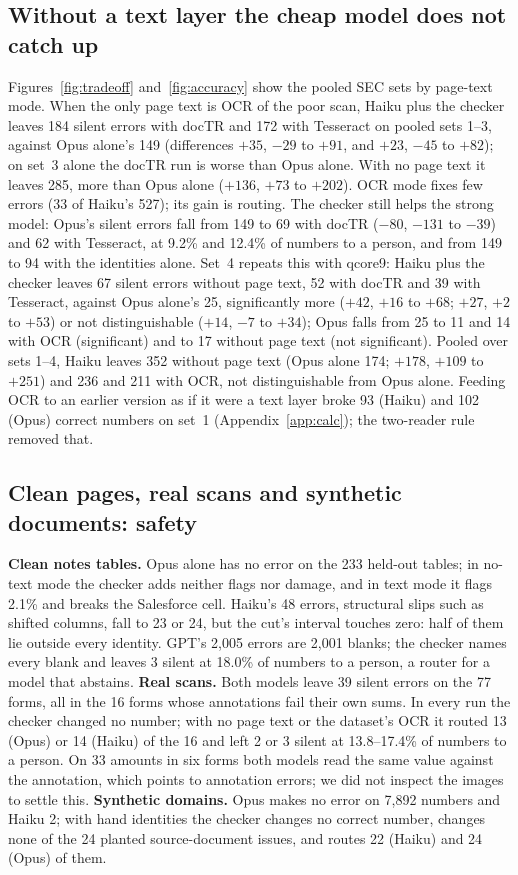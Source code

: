 \documentclass[10pt,twocolumn]{article}
\newcommand{\vq}[1]{\textsf{qcore#1}}
\begin{document}
\subsection{Without a text layer the cheap model does not catch up}\label{sec:ocr}


Figures~\ref{fig:tradeoff} and~\ref{fig:accuracy} show the pooled SEC sets by page-text mode. When the only page text is OCR of the poor scan, Haiku plus the checker leaves 184 silent errors with docTR and 172 with Tesseract on pooled sets 1--3, against Opus alone's 149 (differences $+35$, $-29$ to $+91$, and $+23$, $-45$ to $+82$); on set~3 alone the docTR run is worse than Opus alone. With no page text it leaves 285, more than Opus alone ($+136$, $+73$ to $+202$). OCR mode fixes few errors (33 of Haiku's 527); its gain is routing. The checker still helps the strong model: Opus's silent errors fall from 149 to 69 with docTR ($-80$, $-131$ to $-39$) and 62 with Tesseract, at 9.2\% and 12.4\% of numbers to a person, and from 149 to 94 with the identities alone. Set~4 repeats this with \vq{9}: Haiku plus the checker leaves 67 silent errors without page text, 52 with docTR and 39 with Tesseract, against Opus alone's 25, significantly more ($+42$, $+16$ to $+68$; $+27$, $+2$ to $+53$) or not distinguishable ($+14$, $-7$ to $+34$); Opus falls from 25 to 11 and 14 with OCR (significant) and to 17 without page text (not significant). Pooled over sets 1--4, Haiku leaves 352 without page text (Opus alone 174; $+178$, $+109$ to $+251$) and 236 and 211 with OCR, not distinguishable from Opus alone. Feeding OCR to an earlier version as if it were a text layer broke 93 (Haiku) and 102 (Opus) correct numbers on set~1 (Appendix~\ref{app:calc}); the two-reader rule removed that.

\subsection{Clean pages, real scans and synthetic documents: safety}\label{sec:safety}
\textbf{Clean notes tables.} Opus alone has no error on the 233 held-out tables; in no-text mode the checker adds neither flags nor damage, and in text mode it flags 2.1\% and breaks the Salesforce cell. Haiku's 48 errors, structural slips such as shifted columns, fall to 23 or 24, but the cut's interval touches zero: half of them lie outside every identity. GPT's 2,005 errors are 2,001 blanks; the checker names every blank and leaves 3 silent at 18.0\% of numbers to a person, a router for a model that abstains.
\textbf{Real scans.} Both models leave 39 silent errors on the 77 forms, all in the 16 forms whose annotations fail their own sums. In every run the checker changed no number; with no page text or the dataset's OCR it routed 13 (Opus) or 14 (Haiku) of the 16 and left 2 or 3 silent at 13.8--17.4\% of numbers to a person. On 33 amounts in six forms both models read the same value against the annotation, which points to annotation errors; we did not inspect the images to settle this.
\textbf{Synthetic domains.} Opus makes no error on 7,892 numbers and Haiku 2; with hand identities the checker changes no correct number, changes none of the 24 planted source-document issues, and routes 22 (Haiku) and 24 (Opus) of them.
\end{document}
